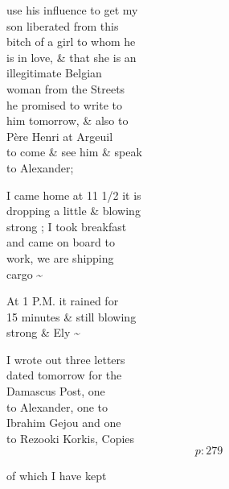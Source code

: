 \documentclass{report}
\begin{document}

	\par{
 	use his influence to get my\ \\son liberated from this\ \\bitch of a girl to whom he\ \\is in love, \& that she is an\ \\illegitimate Belgian\ \\woman from the Streets\ \\he promised to write to\ \\him tomorrow, \& also to\ \\Père Henri at Argeuil\ \\to come \& see him \& speak\ \\to Alexander;\ \\
	}

	\par{
 	I came home at 11 1/2 it is\ \\dropping a little \& blowing\ \\strong ; I took breakfast\ \\and came on board to\ \\work, we are shipping\ \\cargo \~{}\ \\
	}

	\par{
 	At 1 P.M. it rained for\ \\15 minutes \& still blowing\ \\strong \& Ely \~{}\ \\
	}

	\par{
 	I wrote out three letters\ \\dated tomorrow for the\ \\Damascus Post, one\ \\to Alexander, one to\ \\Ibrahim Gejou and one\ \\to Rezooki Korkis, Copies\ \\
  \[p: 279 \]

	}



	\par{
 	of which I have kept\ \\
	}
\end{document}

